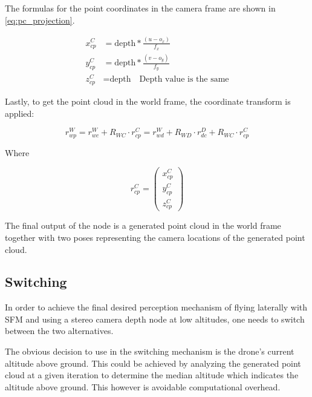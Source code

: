 The formulas for the point coordinates in the camera frame are shown in \cref{eq:pc_projection}.

\begin{align}
    \label{eq:pc_projection}
    x_{cp}^C &= \text{depth} * \frac{\left(u - o_x\right)}{f_x}\\
    y_{cp}^C &= \text{depth} * \frac{\left(v - o_y\right)}{f_y}\\
    z_{cp}^C &= \text{depth} \quad \text{Depth value is the same}
\end{align}

Lastly, to get the point cloud in the world frame, the coordinate transform is applied:

\begin{equation}
    r_{wp}^W = r_{wc}^W + R_{WC} \cdot r_{cp}^C = r_{wd}^W + R_{WD} \cdot r_{dc}^D + R_{WC} \cdot r_{cp}^C
    \label{eq:transform_CW}
\end{equation}

Where

\begin{equation}
    r_{cp}^C = \begin{pmatrix}
        x_{cp}^C\\
        y_{cp}^C\\
        z_{cp}^C
    \end{pmatrix}
    \label{eq:camera_point_vector}
\end{equation}


The final output of the node is a generated point cloud in the world frame together with two poses representing the camera locations of the generated point cloud.


\subsection{Switching}

In order to achieve the final desired perception mechanism of flying laterally with SFM and using a stereo camera depth node at low altitudes, one needs to switch between the two alternatives.

The obvious decision to use in the switching mechanism is the drone's current altitude above ground. This could be achieved by analyzing the generated point cloud at a given iteration to determine the median altitude which indicates the altitude above ground. This however is avoidable computational overhead.

